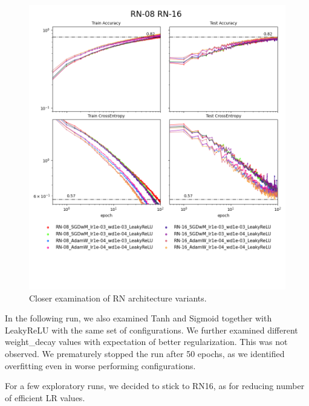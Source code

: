 \documentclass[12pt,a4paper]{article}
\begin{document}
\begin{figure}[H]
  \includegraphics[width=\textwidth, trim={0, 3.5cm, 0, 0}, clip]{../logsRN.png}
  \caption{Closer examination of RN architecture variants.}
\end{figure}

In the following run, we also examined Tanh and Sigmoid together with LeakyReLU with the same
set of configurations. We further examined different 
weight\_decay values with expectation of better regularization.
This was not observed. We prematurely stopped the run after 50 epochs,
as we identified overfitting even in worse performing configurations.

For a few exploratory runs, we decided to stick to RN16, as for reducing
number of efficient LR values. 
\end{document}
